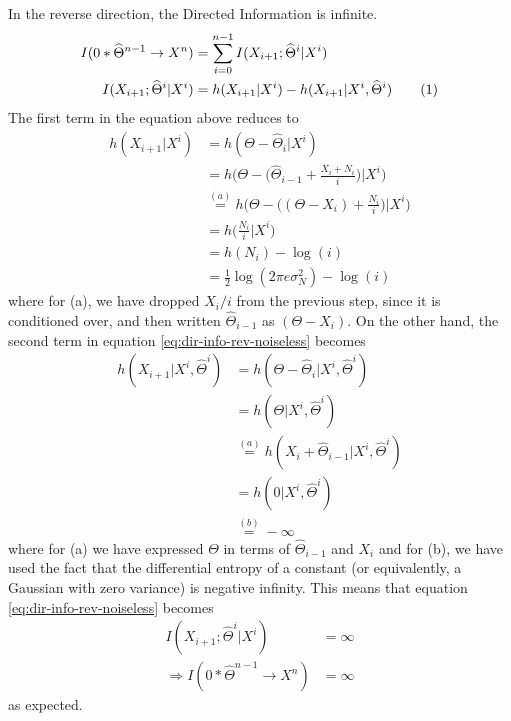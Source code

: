\documentclass[conference]{IEEEtran}
\newcommand\numberthis{\stepcounter{equation}\tag{\theequation}}
\begin{document}
In the reverse direction, the Directed Information is infinite.
\begin{align*}
	I(0*\widehat{\Theta}^{n-1}\rightarrow X^{n}) &= \sum_{i=0}^{n-1}I(X_{i+1};\widehat{\Theta}^{i}|X^{i}) \\
	I(X_{i+1};\widehat{\Theta}^{i}|X^{i})        &= h(X_{i+1}|X^{i}) - h(X_{i+1}|X^{i},\widehat{\Theta}^{i}) \numberthis \label{eq:dir-info-rev-noiseless}
\end{align*}
The first term in the equation above reduces to
\begin{align*}
	h(X_{i+1}|X^{i}) &= h(\Theta-\widehat{\Theta}_{i}|X^{i}) \\
					 &= h \bigg( \Theta- \bigg( \widehat{\Theta}_{i-1}+\frac{X_{i}+N_{i}}{i} \bigg) \bigg| X^{i} \bigg) \\
					 &\overset{(a)}{=} h \bigg( \Theta- \bigg( (\Theta - X_{i}) + \frac{N_{i}}{i} \bigg) \bigg| X^{i} \bigg) \\
					 &= h \bigg( \frac{N_{i}}{i} \bigg| X^{i} \bigg) \\
					 &= h(N_{i}) -\log(i) \\
					 &= \frac{1}{2}\log(2\pi e\sigma_{N}^{2}) -\log(i)
\end{align*}
where for (a), we have dropped $X_i/i$ from the previous step, since it is conditioned over, and then written $\widehat\Theta_{i-1}$ as $(\Theta - X_i)$. On the other hand, the second term in equation \eqref{eq:dir-info-rev-noiseless} becomes
\begin{align*}
	h(X_{i+1} | X^i, \widehat\Theta^i) &= h(\Theta - \widehat\Theta_i | X^i, \widehat\Theta^i) \\
									   &= h(\Theta | X^i, \widehat\Theta^i) \\
									   &\overset{(a)}{=} h(X_i + \widehat\Theta_{i-1} | X^i, \widehat\Theta^i) \\
									   &= h(0 | X^i, \widehat\Theta^i) \\
									   &\overset{(b)}{=} - \infty
\end{align*}
where for (a) we have expressed $\Theta$ in terms of $\widehat\Theta_{i-1}$ and $X_i$ and for (b), we have used the fact that the differential entropy of a constant (or equivalently, a Gaussian with zero variance) is negative infinity. This means that equation \eqref{eq:dir-info-rev-noiseless} becomes
\begin{align*}
	I(X_{i+1};\widehat{\Theta}^{i}|X^{i}) &= \infty \\
	\Rightarrow I(0*\widehat{\Theta}^{n-1}\rightarrow X^{n}) &= \infty
\end{align*}
as expected.
\end{document}
